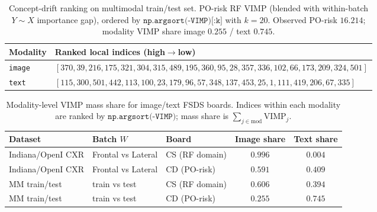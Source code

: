\begin{table}[ht]
\centering
\caption{Concept-drift ranking on multimodal train/test set.
PO-risk RF VIMP (blended with within-batch $Y\sim X$ importance gap), ordered by $\texttt{np.argsort(-VIMP)[:k]}$ with $k{=}20$.
Observed PO-risk $16.214$; modality VIMP share image $0.255$ / text $0.745$.}
\label{tab:imgtxt-mm-cd-rank}
\small
\begin{tabular}{@{}l p{11.5cm}@{}}
\toprule
Modality & Ranked local indices (high$\to$low) \\
\midrule
\texttt{image} & $[370,39,216,175,321,304,315,489,195,360,95,28,357,336,102,66,173,209,324,501]$ \\
\texttt{text}  & $[115,300,501,442,113,100,23,179,96,57,348,137,453,25,1,111,419,206,67,335]$ \\
\bottomrule
\end{tabular}
\end{table}

\begin{table}[ht]
\centering
\caption{Modality-level VIMP mass share for image/text FSDS boards.
Indices within each modality are ranked by $\texttt{np.argsort(-VIMP)}$; mass share is $\sum_{j\in\mathrm{mod}} \mathrm{VIMP}_j$.}
\label{tab:imgtxt-modality-mass}
\small
\begin{tabular}{@{}l ll cc@{}}
\toprule
Dataset & Batch $W$ & Board & Image share & Text share \\
\midrule
Indiana/OpenI CXR & Frontal vs Lateral & CS (RF domain) & $0.996$ & $0.004$ \\
Indiana/OpenI CXR & Frontal vs Lateral & CD (PO-risk) & $0.591$ & $0.409$ \\
MM train/test & train vs test & CS (RF domain) & $0.606$ & $0.394$ \\
MM train/test & train vs test & CD (PO-risk) & $0.255$ & $0.745$ \\
\bottomrule
\end{tabular}
\end{table}
